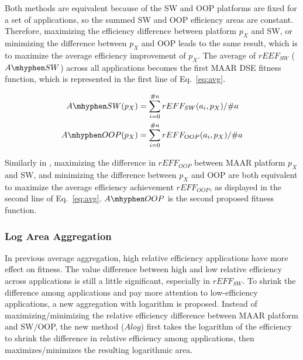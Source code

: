 Both methods are equivalent because of the SW and OOP platforms are fixed for a set of applications, so the summed SW and OOP efficiency areas are constant. 
Therefore, maximizing the efficiency difference between platform $p_{X}$ and SW, or minimizing the difference between $p_{X}$ and OOP leads to the same result, which is to maximize the average efficiency improvement of $p_{X}$. 
The average of $rEEF_{SW}$ ($A \mhyphen SW$) across all applications becomes the first MAAR DSE fitness function, which is represented in the first line of Eq.~\eqref{eq:avg}.

\vspace{-8pt}
\begin{equation}
\begin{split}
	A\mhyphen SW (p_{X}) &= \sum_{i=0}^{\#a} rEFF_{SW}(a_{i}, p_{X}) / \#a \\
	A\mhyphen OOP (p_{X}) &= \sum_{i=0}^{\#a} rEFF_{OOP}(a_{i}, p_{X}) / \#a
\label{eq:avg}
\end{split}
\end{equation}

Similarly in , maximizing the difference in $rEFF_{OOP}$ between MAAR platform $p_{X}$ and SW, and minimizing the difference between $p_{X}$ and OOP are both equivalent to maximize the average efficiency achievement $rEFF_{OOP}$, as displayed in the second line of Eq.~\eqref{eq:avg}. $A \mhyphen OOP$ is the second proposed fitness function.   



\subsubsection{Log Area Aggregation}

In previous average aggregation, high relative efficiency applications have more effect on fitness. The value difference between high and low relative efficiency across applications is still a little significant, especially in $rEFF_{SW}$. To shrink the difference among applications and pay more attention to low-efficiency applications, a new aggregation with logarithm is proposed.
Instead of maximizing/minimizing the relative efficiency difference between MAAR platform and SW/OOP, the new method ($Alog$) first takes the logarithm of the efficiency to shrink the difference in relative efficiency among applications, then maximizes/minimizes the resulting logarithmic area.

